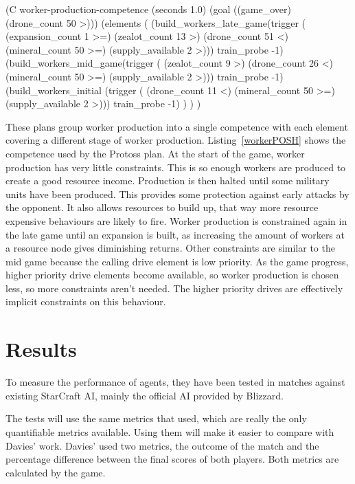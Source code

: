 \documentclass[11pt,openright,a4paper]{report}
\begin{document}
\begin{Code}[frame=single,language=Lisp,tabsize=4,breaklines,breakatwhitespace,caption={A competence to control the production of worker units at different stages of the game.},label=workerPOSH]
(C worker-production-competence (seconds 1.0) (goal ((game_over) (drone_count 50 >)))
	(elements
		(
			(build_workers_late_game(trigger (
										(expansion_count 1 >=)
                                        (zealot_count 13 >)
										(drone_count 51 <)
										(mineral_count 50 >=)
										(supply_available 2 >)))
				train_probe -1)
			(build_workers_mid_game(trigger (
										(zealot_count 9 >)
										(drone_count 26 <)
										(mineral_count 50 >=)
										(supply_available 2 >)))
				train_probe -1)
			(build_workers_initial (trigger (
										(drone_count 11 <)
										(mineral_count 50 >=)
										(supply_available 2 >)))
				train_probe -1)
		)
	)
)
\end{Code}

These plans group worker production into a single competence with each element covering a different stage of worker production. Listing~\ref{workerPOSH} shows the competence used by the Protoss plan. At the start of the game, worker production has very little constraints. This is so enough workers are produced to create a good resource income. Production is then halted until some military units have been produced. This provides some protection against early attacks by the opponent. It also allows resources to build up, that way more resource expensive behaviours are likely to fire. Worker production is constrained again in the late game until an expansion is built, as increasing the amount of workers at a resource node gives diminishing returns. Other constraints are similar to the mid game because the calling drive element is low priority. As the game progress, higher priority drive elements become available, so worker production is chosen less, so more constraints aren't needed. The higher priority drives are effectively implicit constraints on this behaviour.



\chapter{Results}
To measure the performance of agents, they have been tested in matches against existing StarCraft AI, mainly the official AI provided by Blizzard.

The tests will use the same metrics that  used, which are really the only quantifiable metrics available. Using them will make it easier to compare with Davies' work. Davies' used two metrics, the outcome of the match and the percentage difference between the final scores of both players. Both metrics are calculated by the game.
\end{document}
